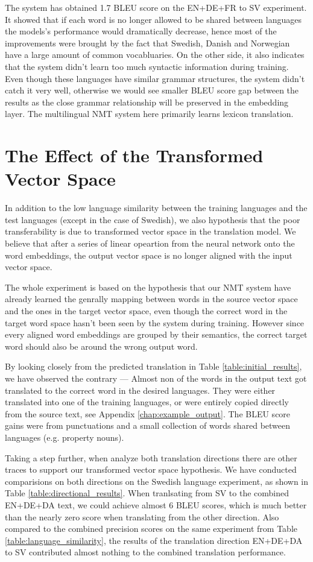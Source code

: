 \documentclass[thesis,fonts=libertine]{cluu}
\begin{document}
The system has obtained 1.7 BLEU score on the EN+DE+FR to SV experiment. It showed that if each word is no longer allowed to be shared between languages the models's performance would dramatically decrease, hence most of the improvements were brought by the fact that Swedish, Danish and Norwegian have a large amount of common vocabluaries. On the other side, it also indicates that the system didn't learn too much syntactic information during training. Even though these languages have similar grammar structures, the system didn't catch it very well, otherwise we would see smaller BLEU score gap between the results as the close grammar relationship will be preserved in the embedding layer. The multilingual NMT system here primarily learns lexicon translation.

\section{The Effect of the Transformed Vector Space}

In addition to the low language similarity between the training languages and the test languages (except in the case of Swedish), we also hypothesis that the poor transferability is due to transformed vector space in the translation model. We believe that after a series of linear opeartion from the neural network onto the word embeddings, the output vector space is no longer aligned with the input vector space.

The whole experiment is based on the hypothesis that our NMT system have already learned the genrally mapping between words in the source vector space and the ones in the target vector space, even though the correct word in the target word space hasn't been seen by the system during training. However since every aligned word embeddings are grouped by their semantics, the correct target word should also be around the wrong output word.

By looking closely from the predicted translation in Table \ref{table:initial_results}, we have observed the contrary --- Almost non of the words in the output text got translated to the correct word in the desired languages. They were either translated into one of the training languages, or were entirely copied directly from the source text, see Appendix \ref{chap:example_output}. The BLEU score gains were from punctuations and a small collection of words shared between languages (e.g. property nouns).

Taking a step further, when analyze both translation directions there are other traces to support our transformed vector space hypothesis. We have conducted comparisions on both directions on the Swedish language experiment, as shown in Table \ref{table:directional_results}. When tranlsating from SV to the combined EN+DE+DA text, we could achieve almost 6 BLEU scores, which is much better than the nearly zero score when translating from the other direction. Also compared to the combined precision scores on the same experiment from Table \ref{table:language_similarity}, the results of the translation direction EN+DE+DA to SV contributed almost nothing to the combined translation performance.
\end{document}

